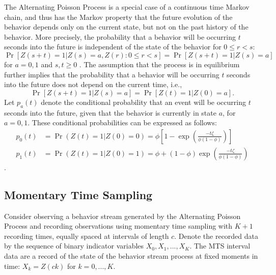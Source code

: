 \documentclass[man, noextraspace, floatsintext]{apa6}\usepackage[]{graphicx}\usepackage[]{color}
\begin{document}
The Alternating Poisson Process is a special case of a continuous time Markov chain, and thus has the Markov property that the future evolution of the behavior depends only on the current state, but not on the past history of the behavior. 
More precisely, the probability that a behavior will be occurring $t$ seconds into the future is independent of the state of the behavior for $0 \leq r < s$: 
\begin{equation}
\label{eq:Markov}
\Pr\left[Z(s + t) = 1 \left| Z(s) = a, Z(r): 0 \leq r < s \right.\right] = \Pr\left[ Z(s + t) = 1 \left| Z(s) = a \right.\right]
\end{equation}
for $a = 0,1$ and $s,t \geq 0$ \citep[Thm. 6.1]{Kulkarni2010modeling}. 
The assumption that the process is in equilibrium further implies that the probability that a behavior will be occurring $t$ seconds into the future does not depend on the current time, i.e.,  
\begin{equation}
\label{eq:equilibrium}
\Pr\left[Z(s + t) = 1 \left| Z(s) = a\right.\right] = \Pr\left[ Z(t) = 1 \left| Z(0) = a \right.\right].
\end{equation}
Let $p_a(t)$ denote the conditional probability that an event will be occurring $t$ seconds into the future, given that the behavior is currently in state $a$, for $a = 0,1$. 
These conditional probabilities can be expressed as follows:
\begin{equation}
\begin{aligned}
p_0(t) &= \Pr(Z(t) = 1 | Z(0) = 0) = \phi \left[1 - \exp\left(\frac{- t \zeta}{\phi (1 - \phi)}\right)\right] \\
p_1(t) &= \Pr(Z(t) = 1 | Z(0) = 1) = \phi + (1 - \phi) \exp\left(\frac{- t \zeta}{\phi (1 - \phi)}\right)
\end{aligned}
\end{equation}
\citep[Eq. 6.17]{Kulkarni2010modeling}.

\subsection{Momentary Time Sampling}
\label{subsec:MTS}

Consider observing a behavior stream generated by the Alternating Poisson Process and recording observations using momentary time sampling with $K + 1$ recording times, equally spaced at intervals of length $c$. 
Denote the recorded data by the sequence of binary indicator variables $X_0,X_1,...,X_K$. The MTS interval data are a record of the state of the behavior stream process at fixed moments in time: $X_k = Z(ck)$ for $k = 0,...,K$. 
\end{document}
